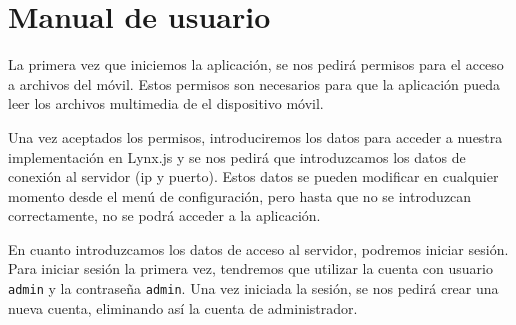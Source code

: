 \chapter{Manual de usuario}
\label{chap:manual_usuario}

La primera vez que iniciemos la aplicación, se nos pedirá permisos para el acceso a archivos del móvil. Estos permisos son necesarios para que la aplicación pueda leer los archivos multimedia de el dispositivo móvil.

Una vez aceptados los permisos, introduciremos los datos para acceder a nuestra implementación en Lynx.js y se nos pedirá que introduzcamos los datos de conexión al servidor (ip y puerto). Estos datos se pueden modificar en cualquier momento desde el menú de configuración, pero hasta que no se introduzcan correctamente, no se podrá acceder a la aplicación.

En cuanto introduzcamos los datos de acceso al servidor, podremos iniciar sesión. Para iniciar sesión la primera vez, tendremos que utilizar la cuenta con usuario \texttt{admin} y la contraseña \texttt{admin}. Una vez iniciada la sesión, se nos pedirá crear una nueva cuenta, eliminando así la cuenta de administrador.


